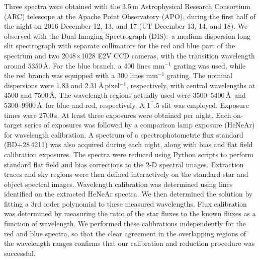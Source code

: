 \documentclass[twocolumn,tighten]{aastex6}
\begin{document}
Three spectra were obtained with the 3.5\,m Astrophysical Research Consortium (ARC) telescope at the Apache Point Observatory (APO), during the first half of the night on 2016 December 12, 13, and 17 (UT December 13, 14, and 18). We observed with the Dual Imaging Spectrograph (DIS):\ a medium dispersion long slit spectrograph with separate collimators for the red and blue part of the spectrum and two 2048$\times$1028 E2V CCD cameras, with the transition wavelength around 5350\,\AA.  For the blue branch, a 400 lines mm$^{-1}$ grating was used, while the red branch was equipped with a 300 lines mm$^{-1}$ grating. The nominal dispersions were 1.83 and 2.31\,\AA\,pixel$^{-1}$, respectively, with central wavelengths at 4500 and 7500\,\AA. The wavelength regions actually used were 3500--5400\,\AA\ and 5300--9900\,\AA\ for blue and red, respectively. A $1^{\prime\prime}\!\!.5$ slit was employed. Exposure times were 2700\,s.  At least three exposures were obtained per night. Each on-target series of exposures was followed by a comparison lamp exposure (HeNeAr) for wavelength calibration. A spectrum of a spectrophotometric flux standard (BD+28\,4211) was also acquired during each night, along with bias and flat field calibration exposures. The spectra were reduced using Python scripts to perform standard flat field and bias corrections to the 2-D spectral images. Extraction traces and sky regions were then defined interactively on the standard star and object spectral images.  Wavelength calibration was determined using lines identified on the extracted HeNeAr spectra. We then determined the solution by fitting a 3rd order polynomial to these measured wavelengths.  Flux calibration was determined by measuring the ratio of the star fluxes to the known fluxes as a function of wavelength.  We performed these calibrations independently for the red and blue spectra, so that the clear agreement in the overlapping regions of the wavelength ranges confirms that our calibration and reduction procedure was successful.
\end{document}
